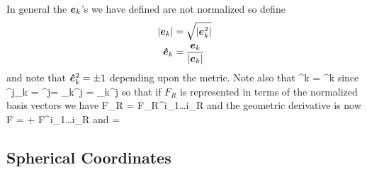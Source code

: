 In general the $\bm{e}_{k}$'s we have defined are not normalized so define
\begin{align}
	\left | {\bm{e}_{k}} \right | &= \sqrt{\left | {\bm{e}_{k}^{2}} \right |} \\
	\bm{\hat{e}}_{k} &= \displaystyle\frac{\bm{e}_{k}}{\left | {\bm{e}_{k}} \right |}
\end{align}
and note that $\bm{\hat{e}}_{k}^{2} = \pm 1$ depending upon the metric.  Note also that
\be
	\ebh^{k} = \eb^{k}
\ee
since
\be
	\ebh^{j}\cdot\ebh_{k} = \lp{}\eb^{j}\rp\cdot\lp{}\rp =
	                        \delta_{k}^{j} = \delta_{k}^{j}
\ee
so that if $F_{R}$ is represented in terms of the normalized basis vectors we have 
\be
	F_{R} = F_{R}^{i_{1}\dots i_{R}}
\ee
and the geometric derivative is now
\be
\hspace{-0.5in}\nabla F = 
+
     F^{i_{1}\dots i_{R}}\lb {}\rb
\ee
and 
\be
{}\lb {}\rb = 
\ee

\subsection{Spherical Coordinates}

